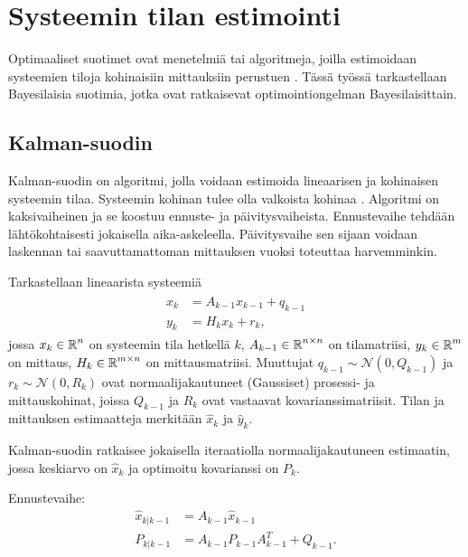\chapter{Systeemin tilan estimointi }%
\label{ch:estimointi}
Optimaaliset suotimet ovat  menetelmiä tai algoritmeja, joilla estimoidaan systeemien tiloja kohinaisiin mittauksiin perustuen \cite{sarkka_bayesian}. Tässä työssä tarkastellaan Bayesilaisia suotimia, jotka ovat ratkaisevat optimointiongelman Bayesilaisittain. 


\section{Kalman-suodin}

Kalman-suodin on algoritmi, jolla voidaan estimoida lineaarisen ja kohinaisen systeemin tilaa. Systeemin kohinan tulee olla valkoista kohinaa \cite[s. 56]{sarkka_bayesian}. Algoritmi on kaksivaiheinen ja se koostuu ennuste- ja päivitysvaiheista. 
Ennustevaihe tehdään lähtökohtaisesti jokaisella aika-askeleella. Päivitysvaihe sen sijaan voidaan laskennan tai saavuttamattoman mittauksen vuoksi toteuttaa harvemminkin. 

Tarkastellaan lineaarista systeemiä
\begin{align}
    \begin{split}
        x_k &= A_{k-1}x_{k-1} + q_{k-1} \\
        y_k &= H_k x_k + r_k,
    \end{split}
\end{align}
jossa \(x_k \in \operatorname{\mathbb{R}}^n \) on systeemin tila hetkellä \(k\), \(A_{k-1}\in \operatorname{\mathbb{R}}^{n\times n}\) on tilamatriisi, \(y_k\in \operatorname{\mathbb{R}}^m\) on mittaus, \(H_k \in \operatorname{\mathbb{R}}^{m \times n}\) on mittausmatriisi. Muuttujat \(q_{k-1} \sim \mathcal{N}(0, Q_{k-1})\) ja \(r_k \sim \mathcal{N}(0, R_k)\) ovat normaalijakautuneet (Gaussiset) prosessi- ja mittauskohinat, joissa \(Q_{k-1}\) ja \(R_k\) ovat vastaavat kovarianssimatriisit. Tilan ja mittauksen estimaatteja merkitään \(\hat{x}_k\) ja \(\hat{y}_k\).

Kalman-suodin ratkaisee jokaisella iteraatiolla normaalijakautuneen estimaatin, jossa keskiarvo on \(\hat{x}_k\) ja optimoitu kovarianssi on \(P_k\).  

Ennustevaihe:
\begin{align}
    \hat{x}_{k | k-1}  &= A_{k-1} \hat{x}_{k-1}\\
    P_{k | k-1} &= A_{k-1} P_{k-1} A_{k-1}^T + Q_{k-1}.
\end{align}


